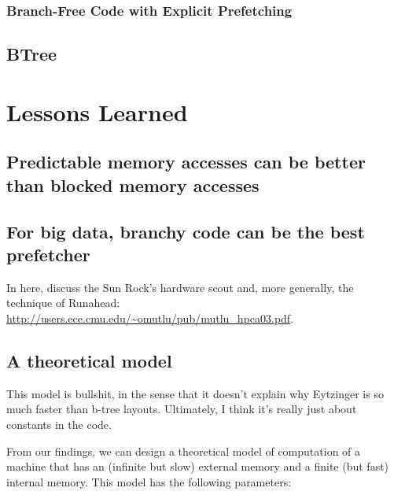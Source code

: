 \documentclass{patmorin}
\begin{document}
\subsubsection{Branch-Free Code with Explicit Prefetching}

\subsection{BTree}


\section{Lessons Learned}

\subsection{Predictable memory accesses can be better than blocked
            memory accesses}

\subsection{For big data, branchy code can be the best prefetcher}

In here, discuss the Sun Rock's hardware scout and, more generally, the technique of Runahead: \url{http://users.ece.cmu.edu/~omutlu/pub/mutlu_hpca03.pdf}.

\subsection{A theoretical model}

This model is bullshit, in the sense that it doesn't explain why Eytzinger
is so much faster than b-tree layouts.  Ultimately, I think it's really just about constants in the code.


From our findings, we can design a theoretical model of computation of
a machine that has an (infinite but slow) external memory and a finite
(but fast) internal memory.  This model has the following parameters:
\end{document}
